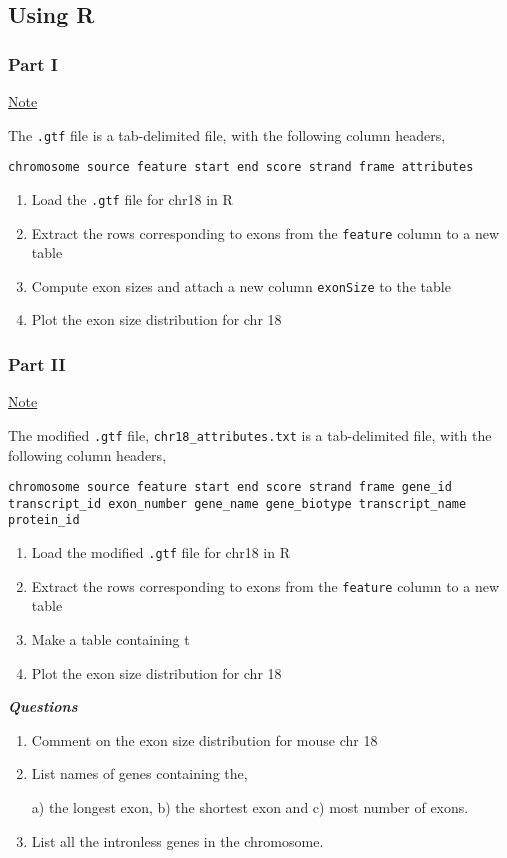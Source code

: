 \documentclass[a4paper,11pt]{article}
\begin{document}
\subsection{Using R}
\subsubsection{Part I}

\normalsize\underline{Note}

\normalsize The \texttt{.gtf} file is a tab-delimited file, with the following column headers,

\scriptsize\texttt {chromosome	source	feature	start	end	score	strand	frame	attributes}

\begin{enumerate}
\normalsize\item Load the \texttt{.gtf} file for chr18 in R
\item Extract the rows corresponding to exons from the \texttt{feature} column to a new table
\item Compute exon sizes and attach a new column \texttt{exonSize} to the table
\item Plot the exon size distribution for chr 18
\end{enumerate}

\subsubsection{Part II}

\normalsize\underline{Note}

\normalsize The modified \texttt{.gtf} file, \texttt{chr18\_attributes.txt} is a tab-delimited file, with the following column headers,

\scriptsize\texttt {chromosome	source	feature	start	end	score	strand	frame	gene\_id	 transcript\_id 	 exon\_number 	 gene\_name 	 gene\_biotype 	 transcript\_name 	 protein\_id }

\begin{enumerate}
\normalsize\item Load the modified \texttt{.gtf} file for chr18 in R
\item Extract the rows corresponding to exons from the \texttt{feature} column to a new table
\item Make a table containing t
\item Plot the exon size distribution for chr 18
\end{enumerate}


\Large {\emph\bf Questions}
\begin{enumerate}
\item Comment on the exon size distribution for mouse chr 18
\normalsize\item List names of genes containing the,

 a) the longest exon, b) the shortest exon and c) most number of exons.
\item List all the intronless genes in the chromosome.
\end{enumerate}
\end{document}

